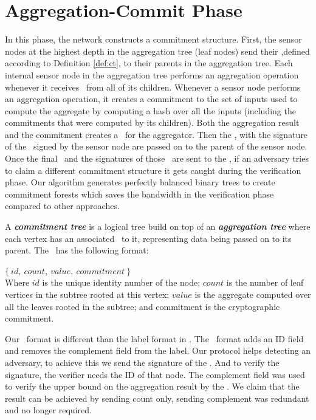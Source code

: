 \section{Aggregation-Commit Phase}
	In this phase, the network constructs a commitment structure. 
	First, the sensor nodes at the highest depth in the aggregation tree (leaf nodes) send their \payloads,defined according to Definition \ref{def:ct}, to their parents in the aggregation tree.
	Each internal sensor node in the aggregation tree performs an aggregation operation whenever it receives \payloads\  from all of its children.
	Whenever a sensor node performs an aggregation operation, it creates a commitment to the set of inputs used to compute the aggregate by computing a hash over all the inputs (including the commitments that were computed by its children). 
	Both the aggregation result and the commitment creates a \payload\ for the aggregator.
	Then the \payload, with the signature of the \payload\ signed by the sensor node are passed on to the parent of the sensor node.
	Once the final \payloads\  and the signatures of those \payloads\  are sent to the \bs, if an adversary tries to claim a different commitment structure it gets caught during the verification phase.
	Our algorithm generates perfectly balanced binary trees to create commitment forests which saves the bandwidth in the verification phase compared to other approaches.

	\begin{definition}\cite{chan2006secure}\label{def:ct}
		A \textbf{\textit{commitment tree}} is a logical tree build on top of an \textbf{\textit{aggregation tree}} where each vertex has an associated \payload\ to it, representing data being passed on to its parent. The \payload\ has the following format:

		$\{\ id,\ count,\ value,\ commitment\ \}$\\
		Where $id$ is the unique identity number of the node; $count$ is the number of leaf vertices in the subtree rooted at this vertex; $value$ is the aggregate computed over all the leaves rooted in the subtree; and commitment is the cryptographic commitment.

	\end{definition}

	Our \payload\ format is different than the label format in \cite{chan2006secure}.
	The \payload\ format adds an ID field and removes the complement field from the label. 
	Our protocol helps detecting an adversary, to achieve this we send the signature of the \payload. 
	And to verify the signature, the verifier needs the ID of that node.
	The complement field was used to verify the upper bound on the aggregation result by the \bs.
	We claim that the result can be achieved by sending count only, sending complement was redundant and no longer required.     


